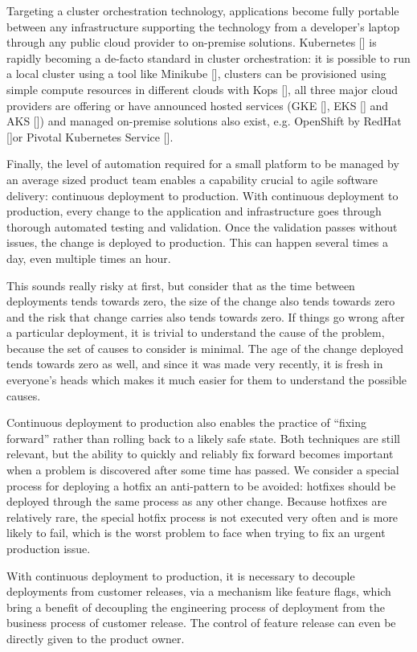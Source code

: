 \documentclass[reprint,amsmath,amssymb,aps]{revtex4-1}
\begin{document}
Targeting a cluster orchestration technology, applications become fully portable between any infrastructure supporting the technology from a developer’s laptop through any public cloud provider to on-premise solutions. Kubernetes [] is rapidly becoming a de-facto standard in cluster orchestration: it is possible to run a local cluster using a tool like Minikube [], clusters can be provisioned using simple compute resources in different clouds with Kops [], all three major cloud providers are offering or have announced hosted services (GKE [], EKS [] and AKS []) and managed on-premise solutions also exist, e.g. OpenShift by RedHat []or Pivotal Kubernetes Service [].

Finally, the level of automation required for a small platform to be managed by an average sized product team enables a capability crucial to agile software delivery: continuous deployment to production. With continuous deployment to production, every change to the application and infrastructure goes through thorough automated testing and validation. Once the validation passes without issues, the change is deployed to production. This can happen several times a day, even multiple times an hour.

This sounds really risky at first, but consider that as the time between deployments tends towards zero, the size of the change also tends towards zero and the risk that change carries also tends towards zero. If things go wrong after a particular deployment, it is trivial to understand the cause of the problem, because the set of causes to consider is minimal. The age of the change deployed tends towards zero as well, and since it was made very recently, it is fresh in everyone’s heads which makes it much easier for them to understand the possible causes.

Continuous deployment to production also enables the practice of “fixing forward” rather than rolling back to a likely safe state. Both techniques are still relevant, but the ability to quickly and reliably fix forward becomes important when a problem is discovered after some time has passed. We consider a special process for deploying a hotfix an anti-pattern to be avoided: hotfixes should be deployed through the same process as any other change. Because hotfixes are relatively rare, the special hotfix process is not executed very often and is more likely to fail, which is the worst problem to face when trying to fix an urgent production issue.

With continuous deployment to production, it is necessary to decouple deployments from customer releases, via a mechanism like feature flags, which bring a benefit of decoupling the engineering process of deployment from the business process of customer release. The control of feature release can even be directly given to the product owner.
\end{document}
